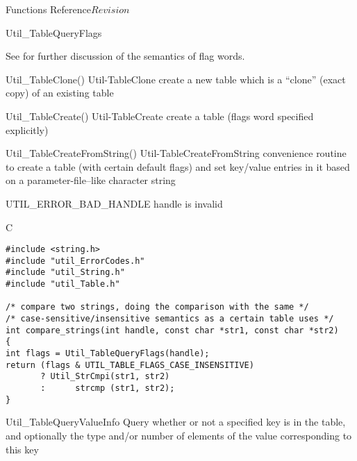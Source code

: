 \begin{cactuspart}{ Functions Reference}{}{$Revision$}
\begin{FunctionDescription}{Util\_TableQueryFlags}
\begin{Discussion}
See  for further discussion of the semantics
of flag words.
\end{Discussion}

\begin{SeeAlsoSection}
\begin{SeeAlso2} {Util\_TableClone()} {Util-TableClone}
create a new table which is a ``clone'' (exact copy) of an existing
table
\end{SeeAlso2}
\begin{SeeAlso2} {Util\_TableCreate()} {Util-TableCreate}
create a table (flags word specified explicitly)
\end{SeeAlso2}
\begin{SeeAlso2} {Util\_TableCreateFromString()} {Util-TableCreateFromString}
convenience routine to create a table (with certain default flags)
and set key/value entries in it based on a parameter-file--like
character string
\end{SeeAlso2}
\end{SeeAlsoSection}

\begin{ErrorSection}
\begin{Error}{UTIL\_ERROR\_BAD\_HANDLE}
handle is invalid
\end{Error}
\end{ErrorSection}

\begin{ExampleSection}
\begin{Example}{C}
\begin{verbatim}
#include <string.h>
#include "util_ErrorCodes.h"
#include "util_String.h"
#include "util_Table.h"

/* compare two strings, doing the comparison with the same */
/* case-sensitive/insensitive semantics as a certain table uses */
int compare_strings(int handle, const char *str1, const char *str2)
{
int flags = Util_TableQueryFlags(handle);
return (flags & UTIL_TABLE_FLAGS_CASE_INSENSITIVE)
       ? Util_StrCmpi(str1, str2)
       :      strcmp (str1, str2);
}
\end{verbatim}
\end{Example}
\end{ExampleSection}
\end{FunctionDescription}


\begin{FunctionDescription}{Util\_TableQueryValueInfo}
\label{Util-TableQueryValueInfo}
Query whether or not a specified key is in the table, and optionally
the type and/or number of elements of the value corresponding to this key


\end{FunctionDescription}
\end{cactuspart}
